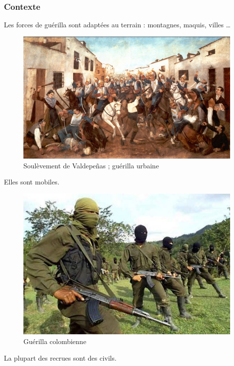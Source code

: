 \documentclass{article}
\begin{document}
\subsubsection{Contexte}
Les forces de guérilla sont adaptées au terrain : montagnes, maquis, villes \ldots
\begin{figure}[H]
	\begin{centering}
	\includegraphics[width=\linewidth]{../ressources/valdepenas}
	\caption{Soulèvement de Valdepeñas ; guérilla urbaine \cite{valdepenas}}
	\end{centering}
\end{figure}
Elles sont mobiles.
\begin{figure}[H]
	\begin{centering}
	\includegraphics[]{../ressources/guerrilla_colombia}
	\caption{Guérilla colombienne \cite{guerrilla_colombia}}
	\end{centering}
\end{figure}
La plupart des recrues sont des civils.
\end{document}
